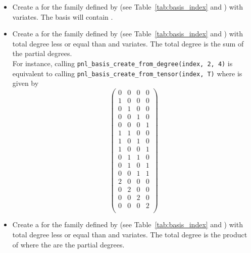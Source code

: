 \begin{itemize}
  \item {}
    \sshortdescribe Create a \PnlBasis for the family
    defined by  (see Table~\ref{tab:basis_index} and
    ) with 
    variates. The basis will contain .

  \item {}
    \sshortdescribe Create a \PnlBasis for the family
    defined by  (see Table~\ref{tab:basis_index} and ) with total degree less
    or equal than  and  variates. The total degree is
    the sum of the partial degrees.\\
    For instance, calling \verb!pnl_basis_create_from_degree(index, 2, 4)! is
    equivalent to calling \verb!pnl_basis_create_from_tensor(index, T)! where
     is given by
    \[ \left(
      \begin{array}{cccc}
        0 & 0 & 0 & 0\\
        1 & 0 & 0 & 0\\
        0 & 1 & 0 & 0\\
        0 & 0 & 1 & 0\\
        0 & 0 & 0 & 1\\
        1 & 1 & 0 & 0\\
        1 & 0 & 1 & 0\\
        1 & 0 & 0 & 1\\
        0 & 1 & 1 & 0\\
        0 & 1 & 0 & 1\\
        0 & 0 & 1 & 1\\
        2 & 0 & 0 & 0\\
        0 & 2 & 0 & 0\\
        0 & 0 & 2 & 0\\
        0 & 0 & 0 & 2\\
      \end{array}
    \right) \]
  \item {}
    \sshortdescribe Create a \PnlBasis for the family
    defined by  (see Table~\ref{tab:basis_index} and ) with total degree less
    or equal than  and  variates. The total degree is
    the product of  where the  are the partial degrees.


\end{itemize}
